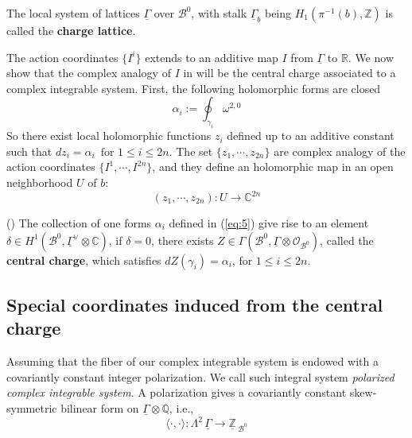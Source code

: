 \documentclass{article}
\begin{document}
\begin{definition}
The local system of lattices $\underline{\Gamma}$ over $\mathcal{B}^{0}$, with stalk $\underline{\Gamma}_{b}$ being $H_{1}(\pi^{-1}(b),\mathbb{Z})$ is called the \textbf{charge lattice}.
\end{definition}

The action coordinates $\{I^{i}\}$ extends to an additive map $I$ from $\underline{\Gamma}$ to $\mathbb{R}$. We now show that the complex analogy of $I$ in will be the central charge associated to a complex integrable system. First, the following holomorphic forms are closed 
\begin{equation}\label{eq:5}
\alpha_{i}:=\oint_{\gamma_{i}}\omega^{2,0}
\end{equation}
So there exist local holomorphic functions $z_{i}$ defined up to an additive constant such that $dz_{i}=\alpha_{i}\,\, \,\text{for}\,\, 1\leq i\leq 2n.$
The set $\{z_{1},\cdots,z_{2n}\}$ are complex analogy of the action coordinates $\{I^{1},\cdots,I^{2n}\}$, and they define an holomorphic map in an open neighborhood $U$ of $b$:
\begin{equation}\label{eq:6}
(z_{1},\cdots,z_{2n}): U\longrightarrow\mathbb{C}^{2n}
\end{equation}


\begin{definition}
(\cite{kontsevich2014wall}) The collection of one forms $\alpha_{i}$ defined in (\ref{eq:5}) give rise to an element $\delta\in H^{1}(\mathcal{B}^{0},\underline{\Gamma}^{\vee}\otimes\mathbb{C})$, if $\delta=0$, there exists $Z\in\Gamma(\mathcal{B}^{0},\underline{\Gamma}\otimes\mathscr{O}_{\mathcal{B}^{0}})$, called the \textbf{central charge}, which satisfies $dZ(\gamma_{i})=\alpha_{i}$, for $1\leq i\leq2n$.
\end{definition}

\subsection{Special coordinates induced from the central charge}

Assuming that the fiber of our complex integrable system is endowed with a covariantly constant integer polarization. We call such integral system \textit{polarized complex integrable system}. A polarization gives a covariantly constant skew-symmetric bilinear form on $\underline{\Gamma}\otimes\mathbb{Q}$, i.e.,
\[\langle\cdot,\cdot\rangle: \Lambda^{2}\,\underline{\Gamma}\to\underline{\mathbb{Z}}\,_{\mathcal{B}^{0}}\]
\end{document}

